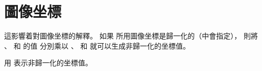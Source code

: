 \section{圖像坐標}

這影響着對圖像坐標的解釋。
如果  所用圖像坐標是歸一化的（中會指定），
則將 、  和  的值
分別乘以 、  和 
就可以生成非歸一化的坐標值。

用  表示非歸一化的坐標值。
